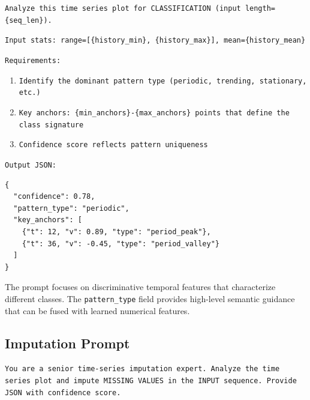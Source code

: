 \begin{tcolorbox}[colback=green!5, colframe=green!70, title=User Prompt Template (Classification)]
\small
\texttt{Analyze this time series plot for CLASSIFICATION (input length=\{seq\_len\}).}

\texttt{Input stats: range=[\{history\_min\}, \{history\_max\}], mean=\{history\_mean\}}

\texttt{Requirements:}
\begin{enumerate}[leftmargin=*, itemsep=0pt]
    \item \texttt{Identify the dominant pattern type (periodic, trending, stationary, etc.)}
    \item \texttt{Key anchors: \{min\_anchors\}-\{max\_anchors\} points that define the class signature}
    \item \texttt{Confidence score reflects pattern uniqueness}
\end{enumerate}

\texttt{Output JSON:}
\begin{verbatim}
{
  "confidence": 0.78,
  "pattern_type": "periodic",
  "key_anchors": [
    {"t": 12, "v": 0.89, "type": "period_peak"},
    {"t": 36, "v": -0.45, "type": "period_valley"}
  ]
}
\end{verbatim}
\end{tcolorbox}

The prompt focuses on discriminative temporal features that characterize different classes. 
The \texttt{pattern\_type} field provides high-level semantic guidance that can be fused with learned numerical features.

\subsection{Imputation Prompt}
\label{appx:prompt_imputation}

\begin{tcolorbox}[colback=gray!5, colframe=gray!50, title=System Prompt (Imputation)]
\small
\texttt{You are a senior time-series imputation expert. Analyze the time series plot and impute MISSING VALUES in the INPUT sequence. Provide JSON with confidence score.}
\end{tcolorbox}

